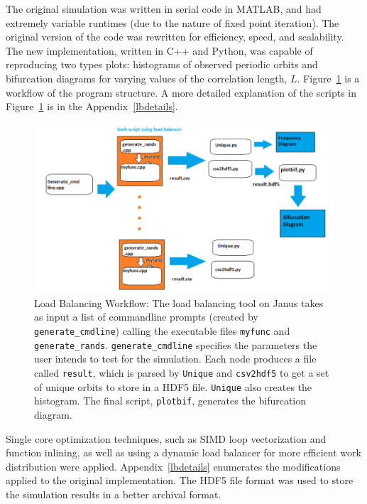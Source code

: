 The original simulation was written in serial code in
MATLAB, and had extremely variable runtimes (due to the nature of fixed
point iteration). The original version of the code was rewritten for efficiency,
speed, and scalability. The new implementation, written in C++ and
Python, was capable of reproducing two types plots: histograms of observed periodic
orbits and bifurcation diagrams for varying values of the correlation
length, $L$. Figure~\ref{fig:workflow} is a workflow of the
program structure. A more detailed explanation of the scripts in
Figure~\ref{fig:workflow} is in the Appendix~\ref{lbdetails}. 
\begin{figure}[H]\linespread{1}
\caption[Load balancing workflow]{Load Balancing Workflow: The load
  balancing tool on Janus takes as input a list of commandline prompts
  (created by \texttt{generate\_cmdline}) calling the
  executable files \texttt{myfunc} and
  \texttt{generate\_rands}. \texttt{generate\_cmdline}
  specifies the parameters the user intends to test for the
  simulation. Each node produces a file called \texttt{result},
  which is parsed by \texttt{Unique} and \texttt{csv2hdf5} to get
  a set of unique orbits to store in a HDF5 file. \texttt{Unique} also creates the histogram. The final script, \texttt{plotbif}, generates the bifurcation diagram.}\label{fig:workflow}
	\begin{center}
          \includegraphics[scale=0.5]{figs/workflow.png}
	\end{center}
\end{figure}

Single core optimization techniques, such as SIMD loop
vectorization and function inlining, as well as using a dynamic load
balancer for more efficient work distribution were
applied. Appendix~\ref{lbdetails} enumerates the modifications applied
to the original implementation. The HDF5
file format was used to store the simulation results in a better
archival format. 

